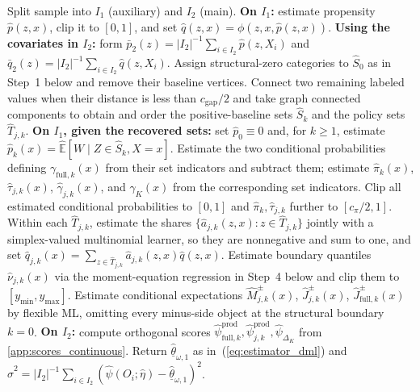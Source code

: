 \begin{algorithm}[h]
\caption{DML estimator: discrete instrument, continuous outcome}\label{alg:dml_continuous_outcome}
\begin{algorithmic}[1]
\STATE Split sample into $I_1$ (auxiliary) and $I_2$ (main).
\STATE \textbf{On $I_1$:} estimate propensity $\hat p(z,x)$, clip it to $[0,1]$, and set $\hat q(z,x) = \phi(z,x,\hat p(z,x))$.
\STATE \textbf{Using the covariates in $I_2$:} form $\bar p_2(z)=|I_2|^{-1}\sum_{i\in I_2}\hat p(z,X_i)$ and $\bar q_2(z)=|I_2|^{-1}\sum_{i\in I_2}\hat q(z,X_i)$. Assign structural-zero categories to $\widehat S_0$ as in Step~1 below and remove their baseline vertices. Connect two remaining labeled values when their distance is less than $c_{\mathrm{gap}}/2$ and take graph connected components to obtain and order the positive-baseline sets $\widehat S_k$ and the policy sets $\widehat T_{j,k}$.
\STATE \textbf{On $I_1$, given the recovered sets:} set $\hat p_0\equiv0$ and, for $k\geqslant1$, estimate $\hat p_k(x)=\widehat{\mathbb E}[W\mid Z\in\widehat S_k,X=x]$. Estimate the two conditional probabilities defining $\gamma_{\mathrm{full},k}(x)$ from their set indicators and subtract them; estimate $\hat\pi_k(x)$, $\hat\tau_{j,k}(x)$, $\hat\gamma_{j,k}(x)$, and $\hat\gamma_K(x)$ from the corresponding set indicators. Clip all estimated conditional probabilities to $[0,1]$ and $\hat\pi_k,\hat\tau_{j,k}$ further to $[c_\pi/2,1]$. Within each $\widehat T_{j,k}$, estimate the shares $\{\hat a_{j,k}(z,x):z\in\widehat T_{j,k}\}$ jointly with a simplex-valued multinomial learner, so they are nonnegative and sum to one, and set $\hat q_{j,k}(x)=\sum_{z\in\widehat T_{j,k}}\hat a_{j,k}(z,x)\hat q(z,x)$.
\STATE Estimate boundary quantiles $\hat\nu_{j,k}(x)$ via the moment-equation regression in Step~4 below and clip them to $[y_{\min},y_{\max}]$.
\STATE Estimate conditional expectations $\hat M_{j,k}^{\pm}(x)$, $\hat J_{j,k}^{\pm}(x)$, $\hat J_{\mathrm{full},k}^{\pm}(x)$ by flexible ML, omitting every minus-side object at the structural boundary $k=0$.
\STATE \textbf{On $I_2$:} compute orthogonal scores $\hat\psi^{\mathrm{prod}}_{\mathrm{full},k}, \hat\psi^{\mathrm{prod}}_{j,k}, \hat\psi_{\Delta_K}$ from \cref{app:scores_continuous}.
\STATE Return $\hat{\underline\theta}_{\omega,1}$ as in~(\ref{eq:estimator_dml}) and $\hat\sigma^2 = |I_2|^{-1}\sum_{i\in I_2}(\hat\psi(O_i;\hat\eta) - \hat{\underline\theta}_{\omega,1})^2$.
\end{algorithmic}
\end{algorithm}

